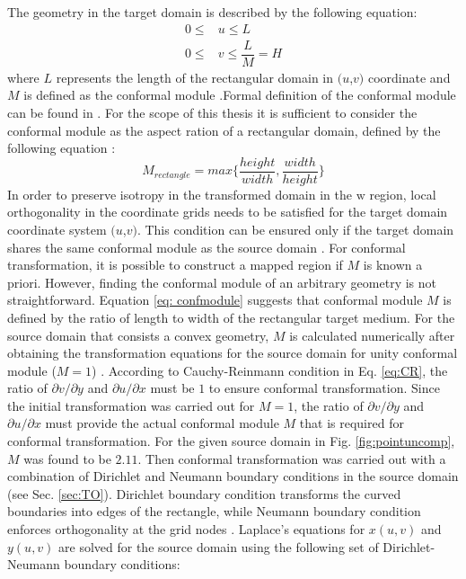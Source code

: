 The geometry in the target domain is described by the following equation:
%
\begin{subequations}
\begin{align}
0 \leq &u \leq L \\
0 \leq &v \leq \dfrac{L}{M} = H
\end{align} 
\end{subequations}
%
where $L$ represents the length of the rectangular domain in $(u$,$v)$ coordinate and $M$ is defined as the conformal module \cite{Leonhardt2009}.Formal definition of the conformal module can be found in \cite{martio2008}. For the scope of this thesis it is sufficient to consider the conformal module as the aspect ration of a rectangular domain, defined by the following equation \cite{Thompson2012}:
%
\begin{equation} \label{eq: confmodule}
M_{rectangle} = max\bigg\{ \dfrac{height}{width},\dfrac{width}{height}\bigg \}
\end{equation}
% 
In order to preserve isotropy in the transformed domain in the $\mathrm{w}$ region, local orthogonality in the coordinate grids needs to be satisfied for the target domain coordinate system $(u$,$v)$. This condition can be ensured only if the target domain shares the same conformal module as the source domain \cite{landy2009}. For conformal transformation, it is possible to construct a mapped region if $M$ is known a priori. However, finding the conformal module of an arbitrary geometry is not straightforward. Equation \ref{eq: confmodule} suggests that conformal module $M$ is defined by the ratio of length to width of the rectangular target medium. For the source domain that consists a convex geometry, $M$ is calculated numerically after obtaining the transformation equations for the source domain for unity conformal module ($M=1$) \cite{yi2015, Henrici1986, Aghanejad2012, aghanejad2016}. According to Cauchy-Reinmann condition in Eq. \ref{eq:CR}, the ratio of $\partial v / \partial y$ and $\partial u / \partial x$ must be $1$ to ensure conformal transformation. Since the initial transformation was carried out for $M=1$, the ratio of $\partial v / \partial y$ and $\partial u / \partial x$ must provide the actual conformal module $M$ that is required for conformal transformation. For the given source domain in Fig. \ref{fig:pointuncomp}, $M$ was found to be $2.11$. Then conformal transformation was carried out with a combination of Dirichlet and Neumann boundary conditions in the source domain (see Sec. \ref{sec:TO}). Dirichlet boundary condition transforms the curved boundaries into edges of the rectangle, while Neumann boundary condition enforces orthogonality at the grid nodes \cite{landy2009}. Laplace's equations for $x(u,v)$ and $y(u,v)$ are solved for the source domain using the following set of Dirichlet-Neumann boundary conditions:
